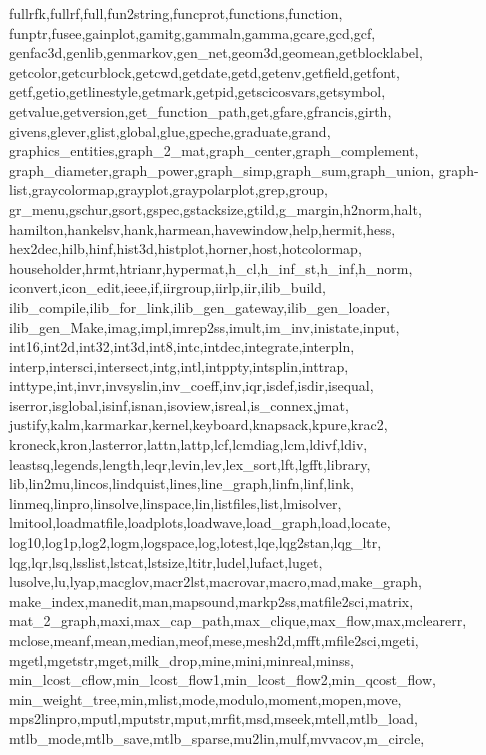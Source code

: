 {{      fullrfk,fullrf,full,fun2string,funcprot,functions,function,%
      funptr,fusee,gainplot,gamitg,gammaln,gamma,gcare,gcd,gcf,%
      genfac3d,genlib,genmarkov,gen_net,geom3d,geomean,getblocklabel,%
      getcolor,getcurblock,getcwd,getdate,getd,getenv,getfield,getfont,%
      getf,getio,getlinestyle,getmark,getpid,getscicosvars,getsymbol,%
      getvalue,getversion,get_function_path,get,gfare,gfrancis,girth,%
      givens,glever,glist,global,glue,gpeche,graduate,grand,%
      graphics_entities,graph_2_mat,graph_center,graph_complement,%
      graph_diameter,graph_power,graph_simp,graph_sum,graph_union,%
      graph-list,graycolormap,grayplot,graypolarplot,grep,group,%
      gr_menu,gschur,gsort,gspec,gstacksize,gtild,g_margin,h2norm,halt,%
      hamilton,hankelsv,hank,harmean,havewindow,help,hermit,hess,%
      hex2dec,hilb,hinf,hist3d,histplot,horner,host,hotcolormap,%
      householder,hrmt,htrianr,hypermat,h_cl,h_inf_st,h_inf,h_norm,%
      iconvert,icon_edit,ieee,if,iirgroup,iirlp,iir,ilib_build,%
      ilib_compile,ilib_for_link,ilib_gen_gateway,ilib_gen_loader,%
      ilib_gen_Make,imag,impl,imrep2ss,imult,im_inv,inistate,input,%
      int16,int2d,int32,int3d,int8,intc,intdec,integrate,interpln,%
      interp,intersci,intersect,intg,intl,intppty,intsplin,inttrap,%
      inttype,int,invr,invsyslin,inv_coeff,inv,iqr,isdef,isdir,isequal,%
      iserror,isglobal,isinf,isnan,isoview,isreal,is_connex,jmat,%
      justify,kalm,karmarkar,kernel,keyboard,knapsack,kpure,krac2,%
      kroneck,kron,lasterror,lattn,lattp,lcf,lcmdiag,lcm,ldivf,ldiv,%
      leastsq,legends,length,leqr,levin,lev,lex_sort,lft,lgfft,library,%
      lib,lin2mu,lincos,lindquist,lines,line_graph,linfn,linf,link,%
      linmeq,linpro,linsolve,linspace,lin,listfiles,list,lmisolver,%
      lmitool,loadmatfile,loadplots,loadwave,load_graph,load,locate,%
      log10,log1p,log2,logm,logspace,log,lotest,lqe,lqg2stan,lqg_ltr,%
      lqg,lqr,lsq,lsslist,lstcat,lstsize,ltitr,ludel,lufact,luget,%
      lusolve,lu,lyap,macglov,macr2lst,macrovar,macro,mad,make_graph,%
      make_index,manedit,man,mapsound,markp2ss,matfile2sci,matrix,%
      mat_2_graph,maxi,max_cap_path,max_clique,max_flow,max,mclearerr,%
      mclose,meanf,mean,median,meof,mese,mesh2d,mfft,mfile2sci,mgeti,%
      mgetl,mgetstr,mget,milk_drop,mine,mini,minreal,minss,%
      min_lcost_cflow,min_lcost_flow1,min_lcost_flow2,min_qcost_flow,%
      min_weight_tree,min,mlist,mode,modulo,moment,mopen,move,%
      mps2linpro,mputl,mputstr,mput,mrfit,msd,mseek,mtell,mtlb_load,%
      mtlb_mode,mtlb_save,mtlb_sparse,mu2lin,mulf,mvvacov,m_circle,%
}}
